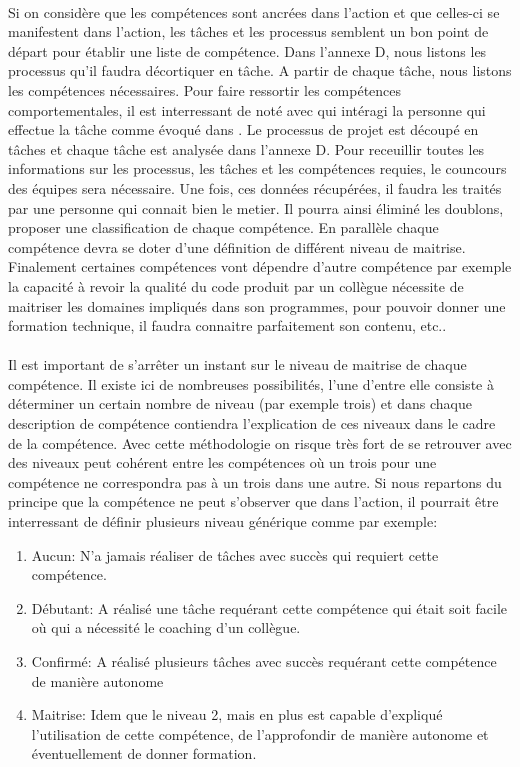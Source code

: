 \paragraph{}Si on considère que les compétences sont ancrées dans l'action et que celles-ci se manifestent dans l'action, les tâches et les processus semblent un bon point de départ pour établir une liste de compétence.  Dans l'annexe D, nous listons les processus qu'il faudra décortiquer en tâche. A partir de chaque tâche, nous listons les compétences nécessaires. Pour faire ressortir les compétences comportementales, il est interressant de noté avec qui intéragi la personne qui effectue la tâche comme évoqué dans \citep[pp. 185]{refcompetence}. Le processus de projet est découpé en tâches et chaque tâche est analysée dans l'annexe D. Pour receuillir toutes les informations sur les processus, les tâches et les compétences requies, le councours des équipes sera nécessaire. Une fois, ces données récupérées, il faudra les traités par une personne qui connait bien le metier. Il pourra ainsi éliminé les doublons, proposer une classification de chaque compétence. En parallèle chaque compétence devra se doter d'une définition de différent niveau de maitrise. Finalement certaines compétences vont dépendre d'autre compétence par exemple la capacité à revoir la qualité du code produit par un collègue nécessite de maitriser les domaines impliqués dans son programmes, pour pouvoir donner une formation technique, il faudra connaitre parfaitement son contenu, etc.. 

\paragraph{} Il est important de s'arrêter un instant sur le niveau de maitrise de chaque compétence. Il existe ici de nombreuses possibilités, l'une d'entre elle consiste à déterminer un certain nombre de niveau (par exemple trois) et dans chaque description de compétence contiendra l'explication de ces niveaux dans le cadre de la compétence. Avec cette méthodologie on risque très fort de se retrouver avec des niveaux peut cohérent entre les compétences où un trois pour une compétence ne correspondra pas à un trois dans une autre. Si nous repartons du principe que la compétence ne peut s'observer que dans l'action, il pourrait être interressant de définir plusieurs niveau générique comme par exemple: 
\begin{enumerate}
  \item Aucun: N'a jamais réaliser de tâches avec succès qui requiert cette compétence.
  \item Débutant: A réalisé une tâche requérant cette compétence qui était soit facile où qui a nécessité le coaching d'un collègue. 
  \item Confirmé: A réalisé plusieurs tâches avec succès requérant cette compétence de manière autonome
  \item Maitrise: Idem que le niveau 2, mais en plus est capable d'expliqué l'utilisation de cette compétence, de l'approfondir de manière autonome et éventuellement de donner formation.
\end{enumerate}
